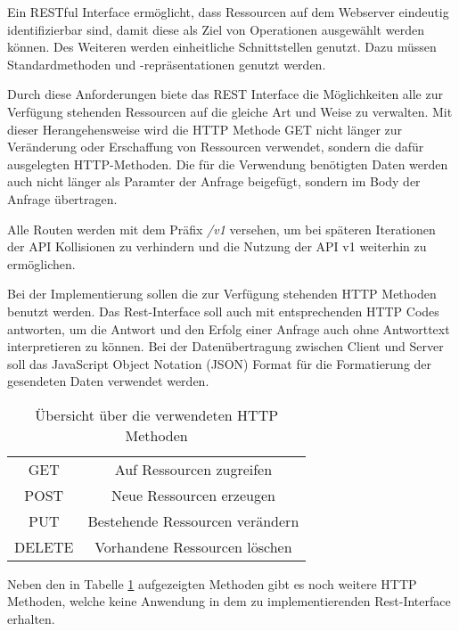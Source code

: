 Ein RESTful Interface ermöglicht, dass Ressourcen auf dem Webserver eindeutig identifizierbar sind, damit diese als Ziel von Operationen ausgewählt werden können. Des Weiteren werden einheitliche Schnittstellen genutzt. Dazu müssen Standardmethoden und -repräsentationen genutzt werden.

Durch diese Anforderungen biete das REST Interface die Möglichkeiten alle zur Verfügung stehenden Ressourcen auf die gleiche Art und Weise zu verwalten. Mit dieser Herangehensweise wird die HTTP Methode GET nicht länger zur Veränderung oder Erschaffung von Ressourcen verwendet, sondern die dafür ausgelegten HTTP-Methoden. Die für die Verwendung benötigten Daten werden auch nicht länger als Paramter der Anfrage beigefügt, sondern im Body der Anfrage übertragen.\cite{beimsWebApplikationenREST2014}

Alle Routen werden mit dem Präfix \textit{/v1} versehen, um bei späteren Iterationen der API Kollisionen zu verhindern und die Nutzung der API v1 weiterhin zu ermöglichen. 

Bei der Implementierung sollen die zur Verfügung stehenden HTTP Methoden benutzt werden. Das Rest-Interface soll auch mit entsprechenden HTTP Codes antworten, um die Antwort und den Erfolg einer Anfrage auch ohne Antworttext interpretieren zu können. Bei der Datenübertragung zwischen Client und Server soll das JavaScript Object Notation (JSON) Format für die Formatierung der gesendeten Daten verwendet werden.

\begin{table}
	\centering
	\begin{tabular}{c c}
		GET & Auf Ressourcen zugreifen \\ 
		POST & Neue Ressourcen erzeugen \\  
		PUT & Bestehende Ressourcen verändern \\
		DELETE & Vorhandene Ressourcen löschen \\
	\end{tabular}
	\caption{Übersicht über die verwendeten HTTP Methoden}
	\label{table:http-methods}
\end{table}

Neben den in Tabelle \ref{table:http-methods} aufgezeigten Methoden gibt es noch weitere HTTP Methoden, welche keine Anwendung in dem zu implementierenden Rest-Interface erhalten.


